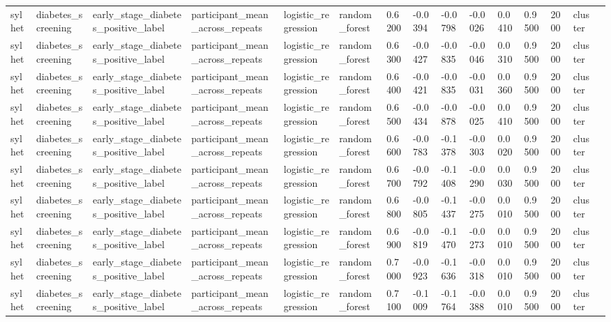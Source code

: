 \begin{tabular}{lllllllllllllll}
sylhet & diabetes\_screening & early\_stage\_diabetes\_positive\_label & participant\_mean\_across\_repeats & logistic\_regression & random\_forest & 0.6200 & -0.0394 & -0.0798 & -0.0026 & 0.0410 & 0.9500 & 2000 & cluster &  \\
sylhet & diabetes\_screening & early\_stage\_diabetes\_positive\_label & participant\_mean\_across\_repeats & logistic\_regression & random\_forest & 0.6300 & -0.0427 & -0.0835 & -0.0046 & 0.0310 & 0.9500 & 2000 & cluster &  \\
sylhet & diabetes\_screening & early\_stage\_diabetes\_positive\_label & participant\_mean\_across\_repeats & logistic\_regression & random\_forest & 0.6400 & -0.0421 & -0.0835 & -0.0031 & 0.0360 & 0.9500 & 2000 & cluster &  \\
sylhet & diabetes\_screening & early\_stage\_diabetes\_positive\_label & participant\_mean\_across\_repeats & logistic\_regression & random\_forest & 0.6500 & -0.0434 & -0.0878 & -0.0025 & 0.0410 & 0.9500 & 2000 & cluster &  \\
sylhet & diabetes\_screening & early\_stage\_diabetes\_positive\_label & participant\_mean\_across\_repeats & logistic\_regression & random\_forest & 0.6600 & -0.0783 & -0.1378 & -0.0303 & 0.0020 & 0.9500 & 2000 & cluster &  \\
sylhet & diabetes\_screening & early\_stage\_diabetes\_positive\_label & participant\_mean\_across\_repeats & logistic\_regression & random\_forest & 0.6700 & -0.0792 & -0.1408 & -0.0290 & 0.0030 & 0.9500 & 2000 & cluster &  \\
sylhet & diabetes\_screening & early\_stage\_diabetes\_positive\_label & participant\_mean\_across\_repeats & logistic\_regression & random\_forest & 0.6800 & -0.0805 & -0.1437 & -0.0275 & 0.0010 & 0.9500 & 2000 & cluster &  \\
sylhet & diabetes\_screening & early\_stage\_diabetes\_positive\_label & participant\_mean\_across\_repeats & logistic\_regression & random\_forest & 0.6900 & -0.0819 & -0.1470 & -0.0273 & 0.0010 & 0.9500 & 2000 & cluster &  \\
sylhet & diabetes\_screening & early\_stage\_diabetes\_positive\_label & participant\_mean\_across\_repeats & logistic\_regression & random\_forest & 0.7000 & -0.0923 & -0.1636 & -0.0318 & 0.0010 & 0.9500 & 2000 & cluster &  \\
sylhet & diabetes\_screening & early\_stage\_diabetes\_positive\_label & participant\_mean\_across\_repeats & logistic\_regression & random\_forest & 0.7100 & -0.1009 & -0.1764 & -0.0388 & 0.0010 & 0.9500 & 2000 & cluster &  \\

\end{tabular}
